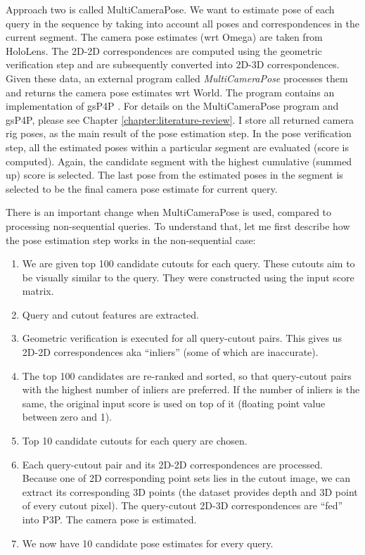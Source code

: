 \documentclass[twoside]{ctuthesis}
\theoremstyle{plain}
\theoremstyle{definition}
\theoremstyle{note}
\newcommand{\topRetrieval}{100} %
\newcommand{\topGV}{10} %
\newcommand{\topPE}{10} %
\begin{document}
Approach two is called MultiCameraPose. We want to estimate pose of each query in the sequence by taking into account all poses and correspondences in the current segment. The camera pose estimates (wrt Omega) are taken from HoloLens. The 2D-2D correspondences are computed using the geometric verification step and are subsequently converted into 2D-3D correspondences. Given these data, an external program called \emph{MultiCameraPose} \cite{MultiCameraPose} processes them and returns the camera pose estimates wrt World. The program contains an implementation of gsP4P \cite{Kukelova2016CVPR}. For details on the MultiCameraPose program and gsP4P, please see Chapter \ref{chapter:literature-review}. I store all returned camera rig poses, as the main result of the pose estimation step. In the pose verification step, all the estimated poses within a particular segment are evaluated (score is computed). Again, the candidate segment with the highest cumulative (summed up) score is selected. The last pose from the estimated poses in the segment is selected to be the final camera pose estimate for current query.

There is an important change when MultiCameraPose is used, compared to processing non-sequential queries. To understand that, let me first describe how the pose estimation step works in the non-sequential case:

\begin{enumerate}
	\item We are given top \topRetrieval{} candidate cutouts for each query. These cutouts aim to be visually similar to the query. They were constructed using the input score matrix.
	\item Query and cutout features are extracted.
	\item Geometric verification is executed for all query-cutout pairs. This gives us 2D-2D correspondences aka ``inliers'' (some of which are inaccurate).
	\item \label{item:GV-reranking} The top \topRetrieval{} candidates are re-ranked and sorted, so that query-cutout pairs with the highest number of inliers are preferred. If the number of inliers is the same, the original input score is used on top of it (floating point value between zero and 1).
	\item \label{item:topGV} Top \topGV{} candidate cutouts for each query are chosen.
	\item Each query-cutout pair and its 2D-2D correspondences are processed. Because one of 2D corresponding point sets lies in the cutout image, we can extract its corresponding 3D points (the dataset provides depth and 3D point of every cutout pixel). The query-cutout 2D-3D correspondences are ``fed'' into P3P. The camera pose is estimated.
	\item We now have \topPE{} candidate pose estimates for every query.
\end{enumerate}
\end{document}
